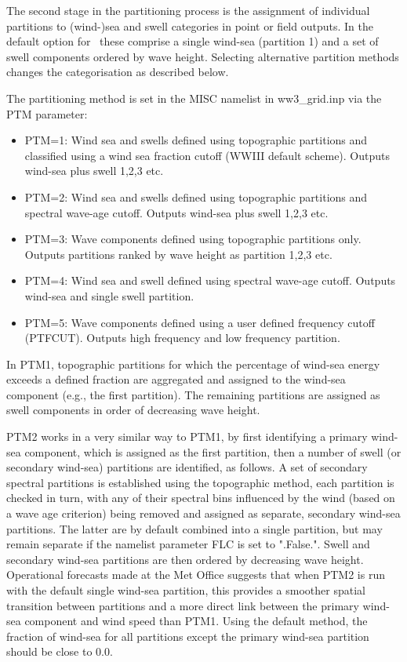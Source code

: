 The second stage in the partitioning process is the assignment of individual
partitions to (wind-)sea and swell categories in point or field outputs. In the
default option for \ws\ these comprise a single wind-sea (partition 1) and a set
of swell components ordered by wave height. Selecting alternative partition methods
changes the categorisation as described below. 

The partitioning method is set in the MISC namelist in ww3\_grid.inp via the PTM parameter:
\begin{itemize}

 \item PTM=1: Wind sea and swells defined using topographic partitions and
   		  classified using a wind sea fraction cutoff (WWIII default scheme).
		  Outputs wind-sea plus swell 1,2,3 etc.

 \item PTM=2: Wind sea and swells defined using topographic partitions and
          spectral wave-age cutoff. Outputs wind-sea plus swell 1,2,3 etc.
		  
 \item PTM=3: Wave components defined using topographic partitions only. Outputs partitions
          ranked by wave height as partition 1,2,3 etc.

 \item PTM=4: Wind sea and swell defined using spectral wave-age cutoff. Outputs wind-sea and single swell partition.

 \item PTM=5: Wave components defined using a user defined frequency cutoff (PTFCUT).
        Outputs high frequency and low frequency partition.
\end{itemize}

In PTM1, topographic partitions for which the percentage of wind-sea energy exceeds a 
defined fraction are aggregated and assigned to the wind-sea component (e.g., the first
partition). The remaining partitions are assigned as swell components in order of 
decreasing wave height.

PTM2 works in a very similar way to PTM1, by first identifying a primary wind-sea component,
which is assigned as the first partition, then a number of swell (or secondary wind-sea) 
partitions are identified, as follows. A set of secondary spectral partitions is established 
using the topographic method, each partition is checked in turn, with any of their spectral 
bins influenced by the wind (based on a wave age criterion) being removed and assigned as 
separate, secondary wind-sea partitions. The latter are by default combined into a single 
partition, but may remain separate if the namelist parameter FLC is set to ".False.". Swell 
and secondary wind-sea partitions are then ordered by decreasing wave height. Operational 
forecasts made at the Met Office suggests that when PTM2 is run with the default single wind-sea 
partition, this provides a smoother spatial transition between partitions and a more direct link 
between the primary wind-sea component and wind speed than PTM1. Using the default method, the 
fraction of wind-sea for all partitions except the primary wind-sea partition should be close to 0.0.

